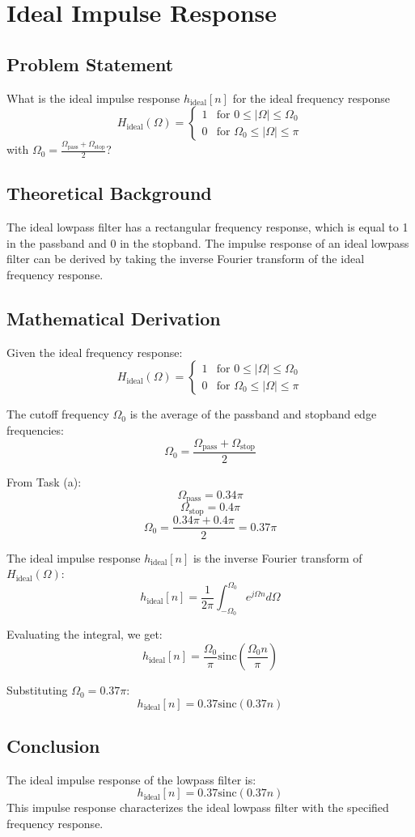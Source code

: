 \item[(b)]
\section{Ideal Impulse Response}

\subsection*{Problem Statement}
What is the ideal impulse response \( h_{\text{ideal}}[n] \) for the ideal frequency response
\[ H_{\text{ideal}}(\Omega)=
\begin{cases}
1 & \text{for } 0 \leq |\Omega| \leq \Omega_0 \\
0 & \text{for } \Omega_0 \leq |\Omega| \leq \pi
\end{cases}
\]
with \( \Omega_0 = \frac{\Omega_{\text{pass}} + \Omega_{\text{stop}}}{2} \)?

\subsection*{Theoretical Background}
The ideal lowpass filter has a rectangular frequency response, which is equal to 1 in the passband and 0 in the stopband. The impulse response of an ideal lowpass filter can be derived by taking the inverse Fourier transform of the ideal frequency response.

\subsection*{Mathematical Derivation}
Given the ideal frequency response:
\[ H_{\text{ideal}}(\Omega)=
\begin{cases}
1 & \text{for } 0 \leq |\Omega| \leq \Omega_0 \\
0 & \text{for } \Omega_0 \leq |\Omega| \leq \pi
\end{cases}
\]

The cutoff frequency \( \Omega_0 \) is the average of the passband and stopband edge frequencies:
\[ \Omega_0 = \frac{\Omega_{\text{pass}} + \Omega_{\text{stop}}}{2} \]

From Task (a):
\[ \Omega_{\text{pass}} = 0.34\pi \]
\[ \Omega_{\text{stop}} = 0.4\pi \]
\[ \Omega_0 = \frac{0.34\pi + 0.4\pi}{2} = 0.37\pi \]

The ideal impulse response \( h_{\text{ideal}}[n] \) is the inverse Fourier transform of \( H_{\text{ideal}}(\Omega) \):
\[ h_{\text{ideal}}[n] = \frac{1}{2\pi} \int_{-\Omega_0}^{\Omega_0} e^{j\Omega n} d\Omega \]

Evaluating the integral, we get:
\[ h_{\text{ideal}}[n] = \frac{\Omega_0}{\pi} \text{sinc}\left(\frac{\Omega_0 n}{\pi}\right) \]

Substituting \( \Omega_0 = 0.37\pi \):
\[ h_{\text{ideal}}[n] = 0.37 \text{sinc}(0.37 n) \]

\subsection*{Conclusion}
The ideal impulse response of the lowpass filter is:
\[ h_{\text{ideal}}[n] = 0.37 \text{sinc}(0.37 n) \]
This impulse response characterizes the ideal lowpass filter with the specified frequency response.

